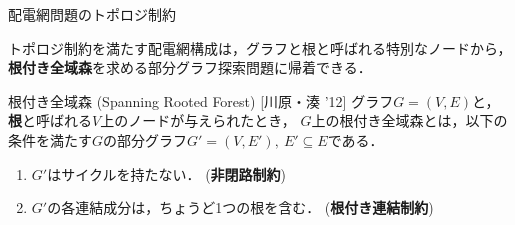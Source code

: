 \documentclass[dvipdfmx,11pt]{beamer}
\begin{document}
\begin{frame}[noframenumbering]{配電網問題のトポロジ制約}
 \begin{alertblock}{}
  トポロジ制約を満たす配電網構成は，グラフと根と呼ばれる特別なノードから，
  \alert{\bf 根付き全域森}を求める部分グラフ探索問題に帰着できる．
 \end{alertblock}
 \vfill
 \begin{block}{根付き全域森 (Spanning Rooted Forest) [川原・湊 '12]}
  グラフ$G=(V,E)$と，
  \textbf{根}と呼ばれる$V$上のノードが与えられたとき，
  $G$上の根付き全域森とは，以下の条件を満たす$G$の部分グラフ$G'=(V,E'),\ E' \subseteq E$である．
  \begin{enumerate}
   \item $G'$はサイクルを持たない． (\alert{\bf 非閉路制約})
   \item $G'$の各連結成分は，ちょうど1つの根を含む． (\alert{\bf 根付き連結制約})
  \end{enumerate}
 \end{block}
\end{frame}
\end{document}
